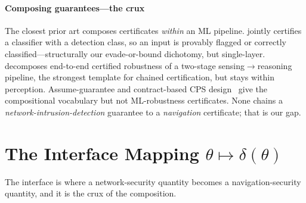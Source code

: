 \documentclass[conference]{IEEEtran}
\begin{document}
\paragraph{Composing guarantees---the crux}
The closest prior art composes certificates \emph{within} an ML pipeline.
\cite{sheikholeslami2021provably} jointly certifies a classifier with a detection
class, so an input is provably flagged or correctly classified---structurally our
evade-or-bound dichotomy, but single-layer. \cite{yang2022sensing} decomposes
end-to-end certified robustness of a two-stage sensing$\to$reasoning pipeline,
the strongest template for chained certification, but stays within perception.
Assume-guarantee and contract-based CPS design~\cite{pacti2024} give the
compositional vocabulary but not ML-robustness certificates. None chains a
\emph{network-intrusion-detection} guarantee to a \emph{navigation} certificate;
that is our gap.

\section{The Interface Mapping $\theta \mapsto \delta(\theta)$}
\label{sec:interface}
The interface is where a network-security quantity becomes a navigation-security
quantity, and it is the crux of the composition.
\end{document}
